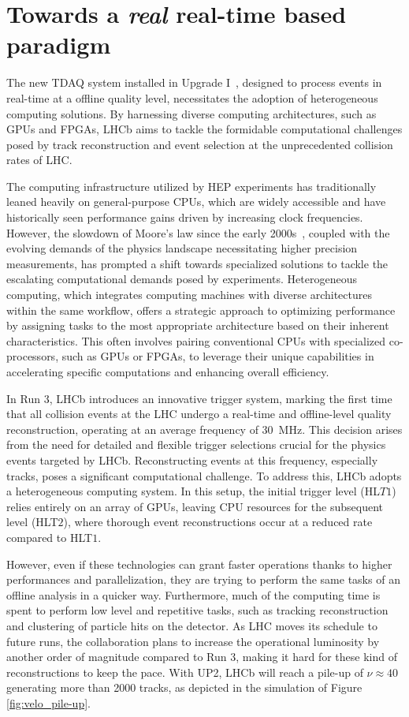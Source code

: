 \section{Towards a \textit{real} real-time based paradigm}
The new TDAQ system installed in Upgrade I~\cite{lhcbcollaboration2023lhcb}, designed to process events in real-time at a offline quality level, necessitates the adoption of heterogeneous computing solutions. By harnessing diverse computing architectures, such as GPUs and FPGAs, LHCb aims to tackle the formidable computational challenges posed by track reconstruction and event selection at the unprecedented collision rates of LHC.

The computing infrastructure utilized by HEP experiments has traditionally leaned heavily on general-purpose CPUs, which are widely accessible and have historically seen performance gains driven by increasing clock frequencies. However, the slowdown of Moore's law since the early 2000s~\cite{Tuomi_2002}, coupled with the evolving demands of the physics landscape necessitating higher precision measurements, has prompted a shift towards specialized solutions to tackle the escalating computational demands posed by experiments. Heterogeneous computing, which integrates computing machines with diverse architectures within the same workflow, offers a strategic approach to optimizing performance by assigning tasks to the most appropriate architecture based on their inherent characteristics. This often involves pairing conventional CPUs with specialized co-processors, such as GPUs or FPGAs, to leverage their unique capabilities in accelerating specific computations and enhancing overall efficiency.

In Run 3, LHCb introduces an innovative trigger system, marking the first time that all collision events at the LHC undergo a real-time and offline-level quality reconstruction, operating at an average frequency of \SI{30}{\mega\hertz}. This decision arises from the need for detailed and flexible trigger selections crucial for the physics events targeted by LHCb. Reconstructing events at this frequency, especially tracks, poses a significant computational challenge. To address this, LHCb adopts a heterogeneous computing system. In this setup, the initial trigger level (HL$T1$) relies entirely on an array of GPUs, leaving CPU resources for the subsequent level (HLT$2$), where thorough event reconstructions occur at a reduced rate compared to HLT$1$. 

However, even if these technologies can grant faster operations thanks to higher performances and parallelization, they are trying to perform the same tasks of an offline analysis in a quicker way. Furthermore, much of the computing time is spent to perform low level and repetitive tasks, such as tracking reconstruction and clustering of particle hits on the detector. As LHC moves its schedule to future runs, the collaboration plans to increase the operational luminosity by another order of magnitude compared to Run 3, making it hard for these kind of reconstructions to keep the pace. With UP2, LHCb will reach a pile-up of $\nu\approx 40$ generating more than 2000 tracks, as depicted in the simulation of Figure \ref{fig:velo_pile-up}. 

